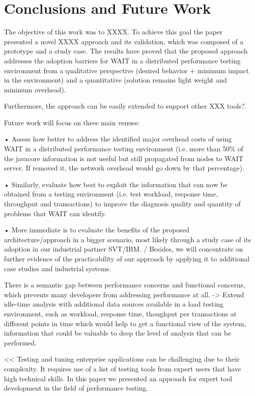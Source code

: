 \documentclass[runningheads,a4paper]{llncs}
\begin{document}
\section{Conclusions and Future Work}

The objective of this work was to XXXX. To achieve this goal the 
paper presented a novel XXXX approach and its validation, which was composed of
a prototype and a study case. The results have proved that the 
proposed approach addresses the adoption barriers for WAIT in a
distributed performance testing environment from a qualitative perspective 
(desired behavior + minimum impact in the environment) and a quantitative 
(solution remains light weight and minimum overhead).

Furthermore, the approach can be easily extended to support other XXX tools?.

Future work will focus on three main venues:

• Assess how better to address the identified major overhead costs of using WAIT
in a distributed performance testing environment (i.e. more than 50\% of the
javacore information is not useful but still propagated from nodes to WAIT server. 
If removed it, the network overhead would go down by that percentage).

• Similarly, evaluate how best to exploit the information that can now be
obtained from a testing environment (i.e. test workload, response time, throughput and 
transactions) to improve the diagnosis quality and quantity of problems that WAIT can 
identify.

• More immediate is to evaluate the benefits of the proposed
architecture/approach in a bigger scenario, most likely through a study case of its 
adoption in our industrial partner SVT/IBM. 
/ 
Besides, we will concentrate on
further evidence of the practicability of our approach by applying it to additional case studies and industrial systems.

There is a semantic gap between performance concerns and functional concerns,
which prevents many developers from addressing performance at all. -> Extend
idle-time analysis with additional data sources available in a load testing
environment, such as workload, response time, thoughput per transactions at
different points in time which would help to get a functional view of the
system, information that could be valuable to deep the level of analysis that
can be performed.

<<
Testing and tuning enterprise applications can be
challenging due to their complexity. It requires use of a list of testing tools from expert users that have high technical skills. 
In this paper we presented an approach for expert tool
development in the field of performance testing. 
\end{document}
